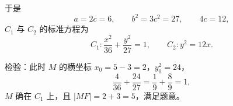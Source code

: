 \begin{answer}
于是
\nopagebreak[4]
\[a=2c=6,\qquad b^2=3c^2=27,\qquad 4c=12,\]
$C_1$ 与 $C_2$ 的标准方程为
\nopagebreak[4]
\[C_1:\frac{x^2}{36}+\frac{y^2}{27}=1,\qquad C_2:y^2=12x .\]

检验：此时 $M$ 的横坐标 $x_0=5-3=2$，$y_0^2=24$，
\nopagebreak[4]
\[\frac{4}{36}+\frac{24}{27}=\frac19+\frac89=1,\]
$M$ 确在 $C_1$ 上，且 $|MF|=2+3=5$，满足题意。



\end{answer}
